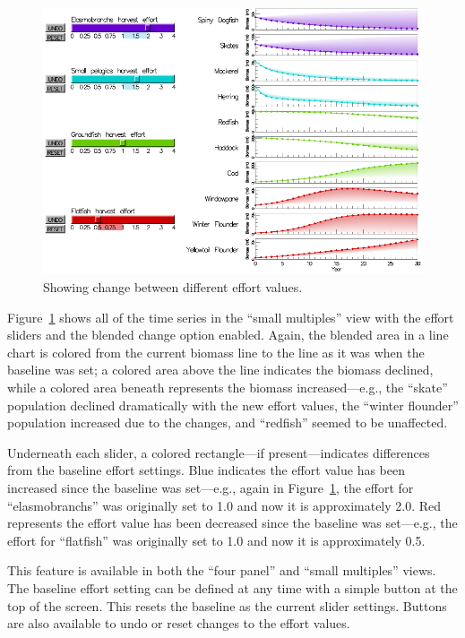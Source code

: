 \begin{figure}[h]
	\centering
	\includegraphics[width=12cm]{figures/png/msprod_change.png}
	\caption[Showing change between different effort values]{Showing change between different effort values.}
	\label{fig:msprod_change}
\end{figure}

Figure~\ref{fig:msprod_change} shows all of the time series in the ``small multiples'' view with the effort sliders and the blended change option enabled.  Again, the blended area in a line chart is colored from the current biomass line to the line as it was when the baseline was set; a colored area above the line indicates the biomass declined, while a colored area beneath represents the biomass increased---e.g., the ``skate'' population declined dramatically with the new effort values, the ``winter flounder'' population increased due to the changes, and ``redfish'' seemed to be unaffected.

Underneath each slider, a colored rectangle---if present---indicates differences from the baseline effort settings.  Blue indicates the effort value has been increased since the baseline was set---e.g., again in Figure~\ref{fig:msprod_change}, the effort for ``elasmobranchs'' was originally set to 1.0 and now it is approximately 2.0.  Red represents the effort value has been decreased since the baseline was set---e.g., the effort for ``flatfish'' was originally set to 1.0 and now it is approximately 0.5.

This feature is available in both the ``four panel'' and ``small multiples'' views.  The baseline effort setting can be defined at any time with a simple button at the top of the screen.  This resets the baseline as the current slider settings.  Buttons are also available to undo or reset changes to the effort values.

